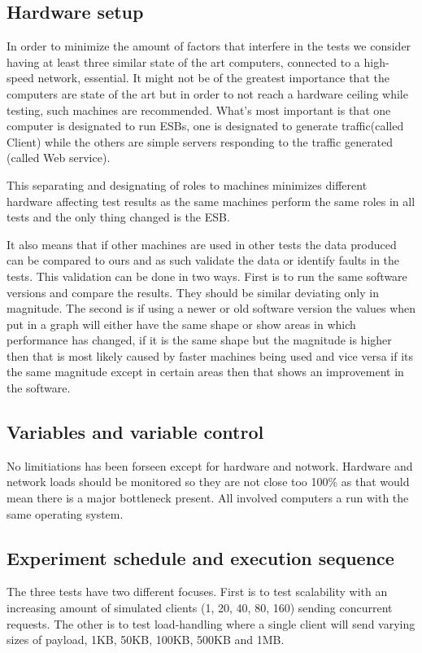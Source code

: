 \subsection{Hardware setup}
In order to minimize the amount of factors that interfere in the tests we consider having at least three similar state of the art computers, connected to a high-speed network, essential.
It might not be of the greatest importance that the computers are state of the art but in order to not reach a hardware ceiling while testing, such machines are recommended. 
What's most important is that one computer is designated to run ESBs, one is designated to generate traffic(called Client) while the others are simple servers responding to the traffic generated (called Web service). 


This separating and designating of roles to machines minimizes different hardware affecting test results as the same machines perform the same roles in all tests and the only thing changed is the ESB. 

It also means that if other machines are used in other tests the data produced can be compared to ours and as such validate the data or identify faults in the tests. 
This validation can be done in two ways. 
First is to run the same software versions and compare the results. 
They should be similar deviating only in magnitude. The second is if using a newer or old software version the values when put in a graph will either have the same shape or show areas in which performance has changed, 
if it is the same shape but the magnitude is higher then that is most likely caused by faster machines being used and vice versa if its the same magnitude except in certain areas then that shows an improvement in the software.

\subsection{Variables and variable control}
No limitiations has been forseen except for hardware and notwork.
Hardware and network loads should be monitored so they are not close too 100\% as that would mean there is a major bottleneck present. 
All involved computers a run with the same operating system.
\subsection{Experiment schedule and execution sequence}
The three tests have two different focuses. First is to test scalability with an increasing amount of simulated clients (1, 20, 40, 80, 160) sending concurrent requests. 
The other is to test load-handling where a single client will send varying sizes of payload, 1KB, 50KB, 100KB, 500KB and 1MB.
